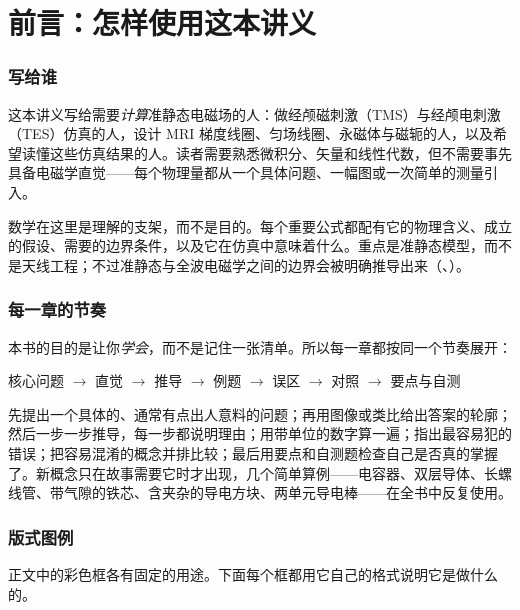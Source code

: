 \chapter*{前言：怎样使用这本讲义}

\subsection*{写给谁}
这本讲义写给需要\emph{计算}准静态电磁场的人：做经颅磁刺激（TMS）与经颅电刺激（TES）仿真的人，设计 MRI 梯度线圈、匀场线圈、永磁体与磁轭的人，以及希望读懂这些仿真结果的人。读者需要熟悉微积分、矢量和线性代数，但不需要事先具备电磁学直觉——每个物理量都从一个具体问题、一幅图或一次简单的测量引入。

数学在这里是理解的支架，而不是目的。每个重要公式都配有它的物理含义、成立的假设、需要的边界条件，以及它在仿真中意味着什么。重点是准静态模型，而不是天线工程；不过准静态与全波电磁学之间的边界会被明确推导出来（、）。

\subsection*{每一章的节奏}
本书的目的是让你\emph{学会}，而不是记住一张清单。所以每一章都按同一个节奏展开：
\begin{center}\sffamily\small
核心问题 \;$\rightarrow$\; 直觉 \;$\rightarrow$\; 推导 \;$\rightarrow$\; 例题 \;$\rightarrow$\; 误区 \;$\rightarrow$\; 对照 \;$\rightarrow$\; 要点与自测
\end{center}
先提出一个具体的、通常有点出人意料的问题；再用图像或类比给出答案的轮廓；然后一步一步推导，每一步都说明理由；用带单位的数字算一遍；指出最容易犯的错误；把容易混淆的概念并排比较；最后用要点和自测题检查自己是否真的掌握了。新概念只在故事需要它时才出现，几个简单算例——电容器、双层导体、长螺线管、带气隙的铁芯、含夹杂的导电方块、两单元导电棒——在全书中反复使用。

\subsection*{版式图例}
正文中的彩色框各有固定的用途。下面每个框都用它自己的格式说明它是做什么的。

